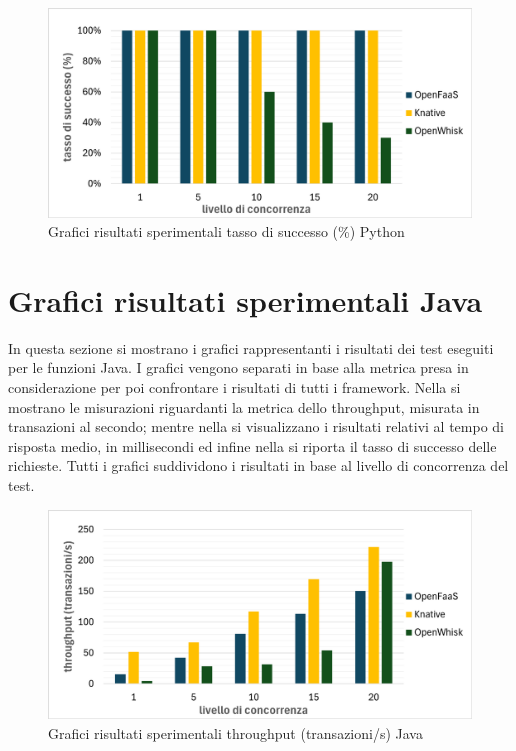 \documentclass[12pt,a4paper,openany,twoside]{book}
\begin{document}
\begin{figure}[ht]
    \centering
    \includegraphics[width=0.95\linewidth]{figures/graphs/tassoSuccesso_python.pdf}
    \caption{Grafici risultati sperimentali tasso di successo (\%) Python}
    \label{fig:grafici-tasso-successo-python}
\end{figure}


\section{Grafici risultati sperimentali Java}

In questa sezione si mostrano i grafici rappresentanti i risultati dei test eseguiti per le funzioni Java. I grafici vengono separati in base alla metrica presa in considerazione per poi confrontare i risultati di tutti i framework. Nella  si mostrano le misurazioni riguardanti la metrica dello throughput, misurata in transazioni al secondo; mentre nella  si visualizzano i risultati relativi al tempo di risposta medio, in millisecondi ed infine nella  si riporta il tasso di successo delle richieste. Tutti i grafici suddividono i risultati in base al livello di concorrenza del test.

\begin{figure}[ht]
    \centering
    \includegraphics[width=0.95\linewidth]{figures/graphs/throughput_java.pdf}
    \caption{Grafici risultati sperimentali throughput (transazioni/s) Java}
    \label{fig:grafici-throughput-java}
\end{figure}
\end{document}
